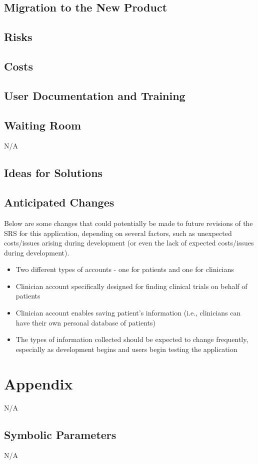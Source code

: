 \documentclass[12pt, titlepage]{article}
\begin{document}
\subsection{Migration to the New Product}

\subsection{Risks}

\subsection{Costs}

\subsection{User Documentation and Training}

\subsection{Waiting Room}

N/A

\subsection{Ideas for Solutions}

\subsection{Anticipated Changes}

Below are some changes that could potentially be made to future 
revisions of the SRS for this application, depending on several factors,
such as unexpected costs/issues arising during development (or even the lack 
of expected costs/issues during development).

\begin{itemize}
    \item Two different types of accounts - one for patients and one for clinicians
    \item Clinician account specifically designed for finding clinical trials on behalf of patients
    \item Clinician account enables saving patient's information (i.e., clinicians can have their own personal database of patients)
    \item The types of information collected should be expected to change frequently, especially as development begins and users begin testing the application
\end{itemize}





\newpage

\section{Appendix}

N/A

\subsection{Symbolic Parameters}

N/A
\end{document}
